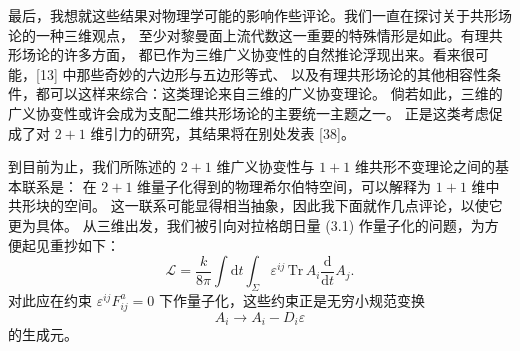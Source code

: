 \documentclass[11pt,a4paper]{article}
\DeclareMathOperator{\Tr}{Tr}
\begin{document}
最后，我想就这些结果对物理学可能的影响作些评论。我们一直在探讨关于共形场论的一种三维观点，
至少对黎曼面上流代数这一重要的特殊情形是如此。有理共形场论的许多方面，
都已作为三维广义协变性的自然推论浮现出来。看来很可能，[13] 中那些奇妙的六边形与五边形等式、
以及有理共形场论的其他相容性条件，都可以这样来综合：这类理论来自三维的广义协变理论。
倘若如此，三维的广义协变性或许会成为支配二维共形场论的主要统一主题之一。
正是这类考虑促成了对 $2+1$ 维引力的研究，其结果将在别处发表 [38]。


到目前为止，我们所陈述的 $2+1$ 维广义协变性与 $1+1$ 维共形不变理论之间的基本联系是：
在 $2+1$ 维量子化得到的物理希尔伯特空间，可以解释为 $1+1$ 维中共形块的空间。
这一联系可能显得相当抽象，因此我下面就作几点评论，以使它更为具体。
从三维出发，我们被引向对拉格朗日量 (3.1) 作量子化的问题，为方便起见重抄如下：
\begin{equation}
    \mathcal{L} = \frac{k}{8\pi} \int \mathrm{d}t \int_\Sigma \varepsilon^{ij}\,
    \mathrm{Tr}\, A_i \frac{\mathrm{d}}{\mathrm{d}t} A_j .
    \tag{5.1}
\end{equation}
对此应在约束 $\varepsilon^{ij}F^a_{ij}=0$ 下作量子化，这些约束正是无穷小规范变换
\begin{equation}
    A_i \to A_i - D_i \varepsilon
    \tag{5.2}
\end{equation}
的生成元。

\end{document}
